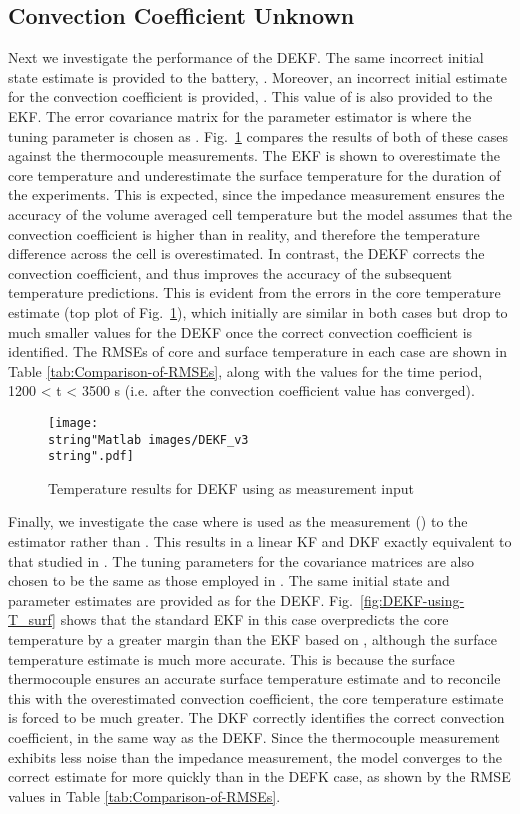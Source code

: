 \documentclass[journal, english]{IEEEtran}
\begin{document}
\subsection{Convection Coefficient Unknown\label{sub:Convection-Coefficient-Unkown}}
Next we investigate the performance of the DEKF. The same incorrect
initial state estimate is provided to the battery, .
Moreover, an incorrect initial estimate for the convection coefficient
is provided, . This value of  is also
provided to the EKF. The error covariance matrix for the parameter
estimator is  where the tuning parameter is
chosen as . Fig.\ \ref{fig:DEKF-with-Z} compares the
results of both of these cases against the thermocouple measurements.
The EKF is shown to overestimate the core temperature and underestimate
the surface temperature for the duration of the experiments. This
is expected, since the impedance measurement ensures the
accuracy of the volume averaged cell temperature but the model assumes that the convection coefficient is higher than in reality, and therefore 
the temperature difference across the cell is overestimated. In contrast,
the DEKF corrects the convection coefficient, and thus improves the
accuracy of the subsequent temperature predictions. This is evident
from the errors in the core temperature estimate (top plot of Fig.\
\ref{fig:DEKF-with-Z}), which initially are similar in both cases
but drop to much smaller values for the DEKF once the correct convection
coefficient is identified. The RMSEs of core and surface temperature
in each case are shown in Table \ref{tab:Comparison-of-RMSEs}, along
with the values for the time period, 1200 < t < 3500 s (i.e. after
the convection coefficient value has converged). 
\begin{figure}\begin{centering}
\texttt{[image: \\string"Matlab images/DEKF\_v3\\string".pdf]}
\par\end{centering}
\caption{Temperature results for DEKF using  as measurement input\label{fig:DEKF-with-Z}}
\end{figure}

Finally, we investigate the case where  is used as the
measurement () to the estimator rather than . This results
in a linear KF and DKF exactly equivalent to that studied in \cite{Kim2014b}.
The tuning parameters for the covariance matrices are also chosen
to be the same as those employed in \cite{Kim2014b}. The same initial
state and parameter estimates are provided as for the DEKF. Fig.\ \ref{fig:DEKF-using-T_surf}
shows that the standard EKF in this case overpredicts the core temperature
by a greater margin than the EKF based on , although the surface
temperature estimate is much more accurate. This is because the surface
thermocouple ensures an accurate surface temperature estimate
and to reconcile this with the overestimated convection coefficient,
the core temperature estimate is forced to be much greater. 
The DKF correctly identifies the correct convection coefficient, in the same way as the DEKF. Since
the thermocouple measurement exhibits less noise than the impedance
measurement, the model converges to the correct estimate for 
more quickly than in the DEFK case, as shown by the RMSE values
in Table \ref{tab:Comparison-of-RMSEs}.
\end{document}
